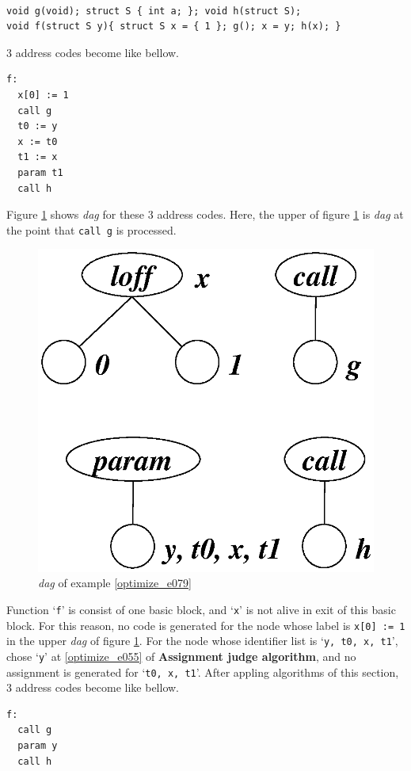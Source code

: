 \begin{Example}
\label{optimize_e079}
\begin{verbatim}

void g(void); struct S { int a; }; void h(struct S);
void f(struct S y){ struct S x = { 1 }; g(); x = y; h(x); }
\end{verbatim}
3 address codes become like bellow.
\begin{verbatim}
f:
  x[0] := 1
  call g
  t0 := y
  x := t0
  t1 := x
  param t1
  call h
\end{verbatim}
Figure \ref{optimize_e080} shows {\em dag} for these 3 address codes.
Here, the upper of figure \ref{optimize_e080} is {\em dag}
at the point that {\tt{call g}} is processed.
\begin{figure}[htbp]
\begin{center}
\includegraphics[width=0.6\linewidth,height=0.6\linewidth]{opt033.eps}
\caption{{\em dag} of example \ref{optimize_e079}}
\label{optimize_e080}
\end{center}
\end{figure}
Function `{\tt{f}}' is consist of one basic block, and 
`{\tt{x}}' is not alive in exit of this basic block.
For this reason, no code is generated
for the node whose label is {\tt{x[0] :=
 1}} in the upper {\em dag} of figure \ref{optimize_e080}.
For the node whose identifier list is `{\tt{y, t0, x, t1}}',
chose `{\tt{y}}' at \ref{optimize_e055} of {\bf Assignment judge
algorithm}, and no assignment is generated for `{\tt{t0, x, t1}}'.
After appling algorithms of this section,
3 address codes become like bellow.
\begin{verbatim}
f:
  call g
  param y
  call h
\end{verbatim}
\end{Example}

